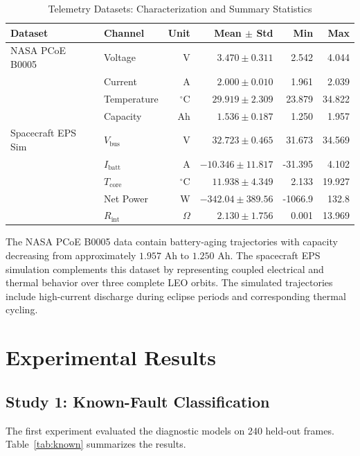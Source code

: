 \documentclass[conference]{IEEEtran}
\begin{document}
\begin{table}[t]
\centering
\caption{Telemetry Datasets: Characterization and Summary Statistics}
\label{tab:datasets}
\small
\begin{tabular}{llrrrr}
\toprule
Dataset & Channel & Unit & Mean $\pm$ Std & Min & Max\\
\midrule
NASA PCoE B0005 & Voltage & V &
$3.470\pm0.311$ & 2.542 & 4.044\\
& Current & A &
$2.000\pm0.010$ & 1.961 & 2.039\\
& Temperature & $^\circ$C &
$29.919\pm2.309$ & 23.879 & 34.822\\
& Capacity & Ah &
$1.536\pm0.187$ & 1.250 & 1.957\\
\midrule
Spacecraft EPS Sim & $V_{\mathrm{bus}}$ & V &
$32.723\pm0.465$ & 31.673 & 34.569\\
& $I_{\mathrm{batt}}$ & A &
$-10.346\pm11.817$ & -31.395 & 4.102\\
& $T_{\mathrm{core}}$ & $^\circ$C &
$11.938\pm4.349$ & 2.133 & 19.927\\
& Net Power & W &
$-342.04\pm389.56$ & -1066.9 & 132.8\\
& $R_{\mathrm{int}}$ & $\Omega$ &
$2.130\pm1.756$ & 0.001 & 13.969\\
\bottomrule
\end{tabular}
\end{table}

The NASA PCoE B0005 data contain battery-aging trajectories with capacity
decreasing from approximately $1.957$ Ah to $1.250$ Ah. The spacecraft EPS
simulation complements this dataset by representing coupled electrical and
thermal behavior over three complete LEO orbits. The simulated trajectories
include high-current discharge during eclipse periods and corresponding
thermal cycling.

\section{Experimental Results}

\subsection{Study 1: Known-Fault Classification}

The first experiment evaluated the diagnostic models on 240 held-out frames.
Table~\ref{tab:known} summarizes the results.
\end{document}
